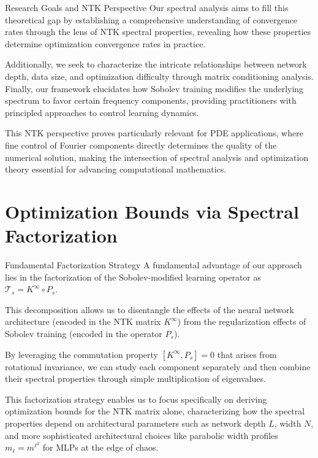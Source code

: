 \documentclass{beamer}
\begin{document}
\begin{frame}{Research Goals and NTK Perspective}
Our spectral analysis aims to fill this theoretical gap by establishing a comprehensive understanding of convergence rates through the lens of NTK spectral properties, revealing how these properties determine optimization convergence rates in practice.

Additionally, we seek to characterize the intricate relationships between network depth, data size, and optimization difficulty through matrix conditioning analysis. Finally, our framework elucidates how Sobolev training modifies the underlying spectrum to favor certain frequency components, providing practitioners with principled approaches to control learning dynamics.

This NTK perspective proves particularly relevant for PDE applications, where fine control of Fourier components directly determines the quality of the numerical solution, making the intersection of spectral analysis and optimization theory essential for advancing computational mathematics.
\end{frame}

\section{Optimization Bounds via Spectral Factorization}

\begin{frame}{Fundamental Factorization Strategy}
A fundamental advantage of our approach lies in the factorization of the Sobolev-modified learning operator as $\mathcal{T}_s = K^{\infty} \circ P_s$.

This decomposition allows us to disentangle the effects of the neural network architecture (encoded in the NTK matrix $K^{\infty}$) from the regularization effects of Sobolev training (encoded in the operator $P_s$).

By leveraging the commutation property $[K^{\infty}, P_s] = 0$ that arises from rotational invariance, we can study each component separately and then combine their spectral properties through simple multiplication of eigenvalues.

This factorization strategy enables us to focus specifically on deriving optimization bounds for the NTK matrix alone, characterizing how the spectral properties depend on architectural parameters such as network depth $L$, width $N$, and more sophisticated architectural choices like parabolic width profiles $m_\ell = m^{\ell^2}$ for MLPs at the edge of chaos.
\end{frame}
\end{document}
